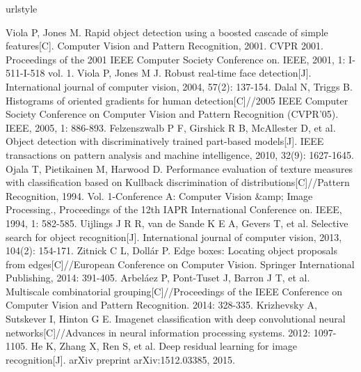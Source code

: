 
% 
%
%
\begin{thebibliography}{148}
\addtolength{\itemsep}{-1.5em}
\setlength{\itemsep}{-1.0pt}
\providecommand{\natexlab}[1]{#1}
\providecommand{\url}[1]{\texttt{#1}}
\expandafter\ifx\csname urlstyle\endcsname\relax
\providecommand{\doi}[1]{doi: #1}\else
\providecommand{\doi}{doi: \begingroup \urlstyle{rm}\Url}\fi



Viola P, Jones M. Rapid object detection using a boosted cascade of simple features[C]. Computer Vision and Pattern Recognition, 2001. CVPR 2001. Proceedings of the 2001 IEEE Computer Society Conference on. IEEE, 2001, 1: I-511-I-518 vol. 1.
Viola P, Jones M J. Robust real-time face detection[J]. International journal of computer vision, 2004, 57(2): 137-154.
Dalal N, Triggs B. Histograms of oriented gradients for human detection[C]//2005 IEEE Computer Society Conference on Computer Vision and Pattern Recognition (CVPR'05). IEEE, 2005, 1: 886-893.
Felzenszwalb P F, Girshick R B, McAllester D, et al. Object detection with discriminatively trained part-based models[J]. IEEE transactions on pattern analysis and machine intelligence, 2010, 32(9): 1627-1645.
Ojala T, Pietikainen M, Harwood D. Performance evaluation of texture measures with classification based on Kullback discrimination of distributions[C]//Pattern Recognition, 1994. Vol. 1-Conference A: Computer Vision \&amp; Image Processing., Proceedings of the 12th IAPR International Conference on. IEEE, 1994, 1: 582-585.
Uijlings J R R, van de Sande K E A, Gevers T, et al. Selective search for object recognition[J]. International journal of computer vision, 2013, 104(2): 154-171.
Zitnick C L, Dollár P. Edge boxes: Locating object proposals from edges[C]//European Conference on Computer Vision. Springer International Publishing, 2014: 391-405.
Arbeláez P, Pont-Tuset J, Barron J T, et al. Multiscale combinatorial grouping[C]//Proceedings of the IEEE Conference on Computer Vision and Pattern Recognition. 2014: 328-335.
Krizhevsky A, Sutskever I, Hinton G E. Imagenet classification with deep convolutional neural networks[C]//Advances in neural information processing systems. 2012: 1097-1105.
He K, Zhang X, Ren S, et al. Deep residual learning for image recognition[J]. arXiv preprint arXiv:1512.03385, 2015.

\end{thebibliography}
